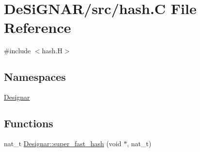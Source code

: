 \hypertarget{hash_8_c}{}\section{De\+Si\+G\+N\+A\+R/src/hash.C File Reference}
\label{hash_8_c}
{\ttfamily \#include $<$hash.\+H$>$}\newline
\subsection*{Namespaces}
\begin{DoxyCompactItemize}
\item 
 \hyperlink{namespace_designar}{Designar}
\end{DoxyCompactItemize}
\subsection*{Functions}
\begin{DoxyCompactItemize}
\item 
nat\+\_\+t \hyperlink{namespace_designar_afd5712d16b3ae1c1c7d59f1004cd96fd}{Designar\+::super\+\_\+fast\+\_\+hash} (void $\ast$, nat\+\_\+t)
\end{DoxyCompactItemize}
